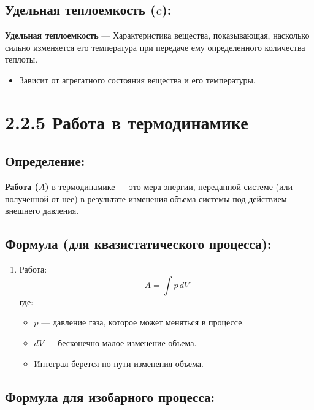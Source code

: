 \documentclass[a4paper,12pt]{article}
\begin{document}
\subsection*{Удельная теплоемкость ($c$):} 
\textbf{Удельная теплоемкость} --- Характеристика вещества, показывающая, насколько сильно изменяется его температура при передаче ему определенного количества теплоты.
\vspace{-3pt}
\begin{itemize}
    \item Зависит от агрегатного состояния вещества и его температуры.
\end{itemize}

\section*{2.2.5 Работа в термодинамике}

\vspace{-9pt}
\subsection*{Определение:}
\vspace{-3pt}
\textbf{Работа ($A$)} в термодинамике — это мера энергии, переданной системе (или полученной от нее) в результате изменения объема системы под действием внешнего давления.

\vspace{-9pt}
\subsection*{Формула (для квазистатического процесса):}
\vspace{-3pt}
\begin{enumerate}[itemsep=0pt, topsep=0pt, parsep=3pt]
    \item Работа:
    \vspace{-0.05em}
    $$ A = \int p \, dV $$
    где:
    \begin{itemize}
        \item $p$ — давление газа, которое может меняться в процессе.
        \item $dV$ — бесконечно малое изменение объема.
        \item Интеграл берется по пути изменения объема.
    \end{itemize}
\end{enumerate}

\vspace{-9pt}
\subsection*{Формула для изобарного процесса:}
\vspace{-3pt}
\end{document}
